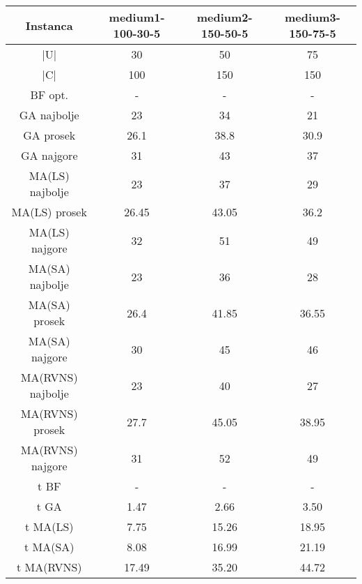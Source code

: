 \documentclass[12pt, a4paper]{article}
\theoremstyle{definition}
\begin{document}
\begin{table}
\begin{adjustbox}{width=\columnwidth,center}
\begin{tabular}{ |c|c|c|c| }
\hline
Instanca & medium1-100-30-5 & medium2-150-50-5 & medium3-150-75-5 \\
\hline
|U| & 30 & 50 & 75 \\
\hline
|C| & 100 & 150 & 150 \\
\hline
BF opt. & - & - & - \\
\hline
GA najbolje & 23 & 34 & 21 \\
\hline
GA prosek & 26.1 & 38.8 & 30.9 \\
\hline
GA najgore & 31 & 43 & 37 \\
\hline
MA(LS) najbolje & 23 & 37 & 29 \\
\hline
MA(LS) prosek & 26.45 & 43.05 & 36.2 \\
\hline
MA(LS) najgore & 32 & 51 & 49 \\
\hline
MA(SA) najbolje & 23 & 36 & 28 \\
\hline
MA(SA) prosek & 26.4 & 41.85 & 36.55 \\
\hline
MA(SA) najgore & 30 & 45 & 46 \\
\hline
MA(RVNS) najbolje & 23 & 40 & 27 \\
\hline
MA(RVNS) prosek & 27.7 & 45.05 & 38.95 \\
\hline
MA(RVNS) najgore & 31 & 52 & 49 \\
\hline
t BF & - & - & - \\
\hline
t GA & 1.47 & 2.66 & 3.50 \\
\hline
t MA(LS) & 7.75 & 15.26 & 18.95 \\
\hline
t MA(SA) & 8.08 & 16.99 & 21.19 \\
\hline
t MA(RVNS) & 17.49 & 35.20 & 44.72 \\
\hline
\end{tabular}
\end{adjustbox}
\end{table}
\end{document}
